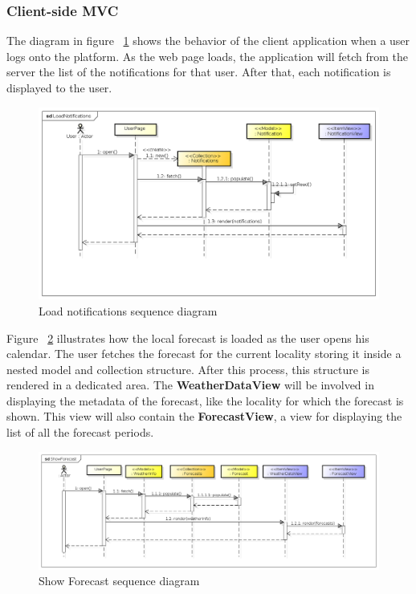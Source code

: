 \subsubsection{Client-side MVC}
The diagram in figure ~\ref{fig:loadnotifSeq} shows the behavior of the client application when a user logs onto the platform. As the web page loads, the application will fetch from the server the list of the notifications for that user. After that, each notification is displayed to the user.
 \begin{center}
 \begin{figure}[H]
    \includegraphics[width=1\textwidth]{../MVCDiagram/MVCBackbone/LoadNotifications.png}
    \caption{Load notifications sequence diagram}
     \label{fig:loadnotifSeq}
     \end{figure}
   \end{center} 
   
Figure ~\ref{fig:forecasteq} illustrates how the local forecast is loaded as the user opens his calendar. The user fetches the forecast for the current locality storing it inside a nested model and collection structure. After this process, this structure is rendered in a dedicated area. The \textbf{WeatherDataView} will be involved in displaying the metadata of the forecast, like the locality for which the forecast is shown. This view will also contain the \textbf{ForecastView}, a view for displaying the list of all the forecast periods.
 \begin{center}
 \begin{figure}[H]
    \includegraphics[width=1\textwidth]{../MVCDiagram/MVCBackbone/ShowForecast.png}
    \caption{Show Forecast sequence diagram}
     \label{fig:forecasteq}
     \end{figure}
   \end{center} 
   
